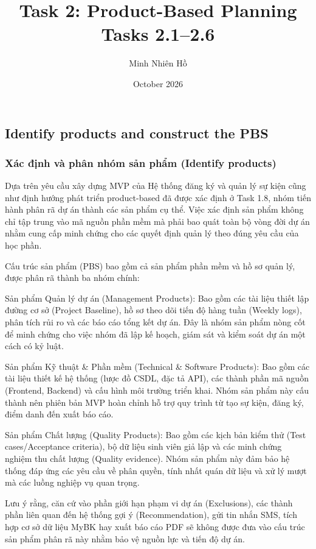 \documentclass{article}
\author{Minh Nhiên Hồ}
\date{October 2026}
\title{Task 2: Product-Based Planning\\Tasks 2.1--2.6}
\begin{document}
\maketitle
\setcounter{section}{2}
\setcounter{subsection}{0}
\subsection{Identify products and construct the PBS}
\subsubsection{Xác định và phân nhóm sản phẩm (Identify products)}
Dựa trên yêu cầu xây dựng MVP của Hệ thống đăng ký và quản lý sự kiện cũng như định hướng phát triển product-based đã được xác định ở Task 1.8, nhóm tiến hành phân rã dự án thành các sản phẩm cụ thể. Việc xác định sản phẩm không chỉ tập trung vào mã nguồn phần mềm mà phải bao quát toàn bộ vòng đời dự án nhằm cung cấp minh chứng cho các quyết định quản lý theo đúng yêu cầu của học phần.

Cấu trúc sản phẩm (PBS) bao gồm cả sản phẩm phần mềm và hồ sơ quản lý, được phân rã thành ba nhóm chính:

Sản phẩm Quản lý dự án (Management Products): Bao gồm các tài liệu thiết lập đường cơ sở (Project Baseline), hồ sơ theo dõi tiến độ hàng tuần (Weekly logs), phân tích rủi ro và các báo cáo tổng kết dự án. Đây là nhóm sản phẩm nòng cốt để minh chứng cho việc nhóm đã lập kế hoạch, giám sát và kiểm soát dự án một cách có kỷ luật.

Sản phẩm Kỹ thuật \& Phần mềm (Technical \& Software Products): Bao gồm các tài liệu thiết kế hệ thống (lược đồ CSDL, đặc tả API), các thành phần mã nguồn (Frontend, Backend) và cấu hình môi trường triển khai. Nhóm sản phẩm này cấu thành nên phiên bản MVP hoàn chỉnh hỗ trợ quy trình từ tạo sự kiện, đăng ký, điểm danh đến xuất báo cáo.

Sản phẩm Chất lượng (Quality Products): Bao gồm các kịch bản kiểm thử (Test cases/Acceptance criteria), bộ dữ liệu sinh viên giả lập và các minh chứng nghiệm thu chất lượng (Quality evidence). Nhóm sản phẩm này đảm bảo hệ thống đáp ứng các yêu cầu về phân quyền, tính nhất quán dữ liệu và xử lý mượt mà các luồng nghiệp vụ quan trọng.

Lưu ý rằng, căn cứ vào phần giới hạn phạm vi dự án (Exclusions), các thành phần liên quan đến hệ thống gợi ý (Recommendation), gửi tin nhắn SMS, tích hợp cơ sở dữ liệu MyBK hay xuất báo cáo PDF sẽ không được đưa vào cấu trúc sản phẩm phân rã này nhằm bảo vệ nguồn lực và tiến độ dự án.
\end{document}
